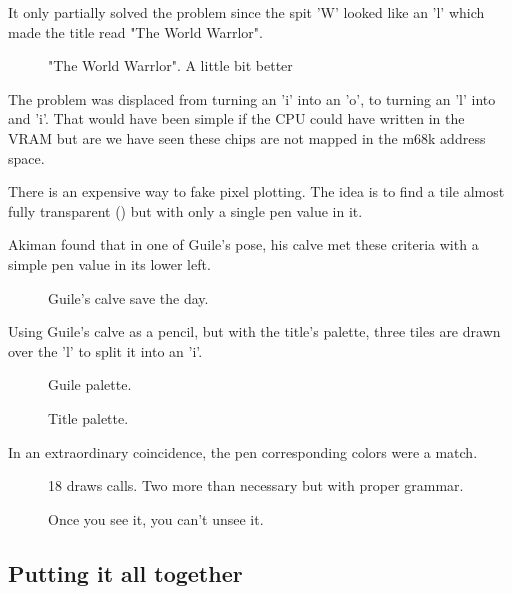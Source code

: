 It only partially solved the problem since the spit 'W' looked like an 'l' which made the title read "The World Warrlor". 

\begin{figure}[H]
 \caption*{"The World Warrlor". A little bit better}%
 \end{figure}%


The problem was displaced from turning an 'i' into an 'o', to turning an 'l' into and 'i'. That would have been simple if the CPU could have written in the VRAM but are we have seen these chips are not mapped in the m68k address space.

There is an expensive way to fake pixel plotting. The idea is to find a tile almost fully transparent () but with only a single pen value in it. 

Akiman found that in one of Guile's pose, his calve met these criteria with a simple pen value in its lower left.

\begin{figure}[H]
\caption*{Guile's calve save the day.}%
 \end{figure}%

Using Guile's calve as a pencil, but with the title's palette, three tiles are drawn over the 'l' to split it into an 'i'.

\begin{figure}[H]
 \caption*{Guile palette.}%
 \end{figure}%

 \begin{figure}[H]
 \caption*{Title palette.}%
 \end{figure}%


 In an extraordinary coincidence, the pen corresponding colors were a match.

\begin{figure}[H]
 \caption*{18 draws calls. Two more than necessary but with proper grammar.}%
 \end{figure}%

\begin{figure}[H]
 \caption*{Once you see it, you can't unsee it.}%
 \end{figure}%



\subsection{Putting it all together}

